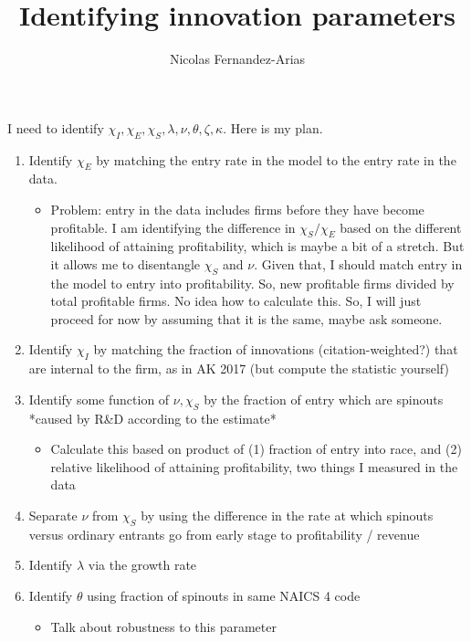 \documentclass[12pt,english]{article}
\theoremstyle{remark}
\begin{document}
	

\title{Identifying innovation parameters}
\author{Nicolas Fernandez-Arias}
\maketitle

I need to identify $\chi_I, \chi_E, \chi_S, \lambda, \nu, \theta, \zeta, \kappa$. Here is my plan.

\begin{enumerate}
	\item Identify $\chi_E$ by matching the entry rate in the model to the entry rate in the data.
	\begin{itemize}
		\item Problem: entry in the data includes firms before they have become profitable. I am identifying the difference in $\chi_S / \chi_E$ based on the different likelihood of attaining profitability, which is maybe a bit of a stretch. But it allows me to disentangle $\chi_S$ and $\nu$. Given that, I should match entry in the model to entry into profitability. So, new profitable firms divided by total profitable firms. No idea how to calculate this. So, I will just proceed for now by assuming that it is the same, maybe ask someone.
	\end{itemize}
	\item Identify $\chi_I$ by matching the fraction of innovations (citation-weighted?) that are internal to the firm, as in AK 2017 (but compute the statistic yourself)
	\item Identify some function of $\nu,\chi_S$ by the fraction of entry which are spinouts *caused by R\&D according to the estimate*
	\begin{itemize}
		\item Calculate this based on product of (1) fraction of entry into race, and (2) relative likelihood of attaining profitability, two things I measured in the data
	\end{itemize}
	\item Separate $\nu$ from $\chi_S$ by using the difference in the rate at which spinouts versus ordinary entrants go from early stage to profitability / revenue
	\item Identify $\lambda$ via the growth rate
	\item Identify $\theta$ using fraction of spinouts in same NAICS 4 code
	\begin{itemize}
		\item Talk about robustness to this parameter
	\end{itemize}

\end{enumerate}
\end{document}
